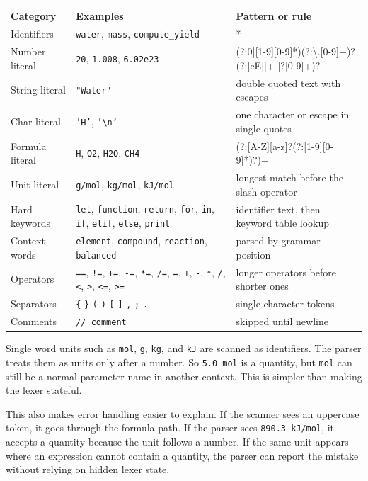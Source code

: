 \documentclass[11pt,a4paper]{article}
\newcommand{\code}[1]{\texttt{#1}}
\newcommand{\rx}[1]{\scriptsize\ttfamily #1}
\begin{document}
{\footnotesize
\begin{tabularx}{\linewidth}{@{}p{2.65cm}p{3.7cm}Y@{}}
\toprule
\textbf{Category} & \textbf{Examples} & \textbf{Pattern or rule} \\
\midrule
Identifiers & \code{water}, \code{mass}, \code{compute\_yield} & \rx{[a-z\_][A-Za-z0-9\_]*} \\
Number literal & \code{20}, \code{1.008}, \code{6.02e23} & \rx{(?:0|[1-9][0-9]*)(?:\textbackslash.[0-9]+)?(?:[eE][+-]?[0-9]+)?} \\
String literal & \code{"Water"} & double quoted text with escapes \\
Char literal & \code{'H'}, \code{'\textbackslash{}n'} & one character or escape in single quotes \\
Formula literal & \code{H}, \code{O2}, \code{H2O}, \code{CH4} & \rx{(?:[A-Z][a-z]?(?:[1-9][0-9]*)?)+} \\
Unit literal & \code{g/mol}, \code{kg/mol}, \code{kJ/mol} & longest match before the slash operator \\
Hard keywords & \code{let}, \code{function}, \code{return}, \code{for}, \code{in}, \code{if}, \code{elif}, \code{else}, \code{print} & identifier text, then keyword table lookup \\
Context words & \code{element}, \code{compound}, \code{reaction}, \code{balanced} & parsed by grammar position \\
Operators & \code{==}, \code{!=}, \code{+=}, \code{-=}, \code{*=}, \code{/=}, \code{=}, \code{+}, \code{-}, \code{*}, \code{/}, \code{<}, \code{>}, \code{<=}, \code{>=} & longer operators before shorter ones \\
Separators & \code{\{} \code{\}} \code{(} \code{)} \code{[} \code{]} \code{,} \code{;} \code{.} & single character tokens \\
Comments & \code{// comment} & skipped until newline \\
\bottomrule
\end{tabularx}}

Single word units such as \code{mol}, \code{g}, \code{kg}, and \code{kJ} are scanned as identifiers.
The parser treats them as units only after a number. So \code{5.0 mol} is a quantity, but \code{mol}
can still be a normal parameter name in another context. This is simpler than making the lexer
stateful.

This also makes error handling easier to explain. If the scanner sees an uppercase token, it goes
through the formula path. If the parser sees \code{890.3 kJ/mol}, it accepts a quantity because the
unit follows a number. If the same unit appears where an expression cannot contain a quantity,
the parser can report the mistake without relying on hidden lexer state.
\end{document}
